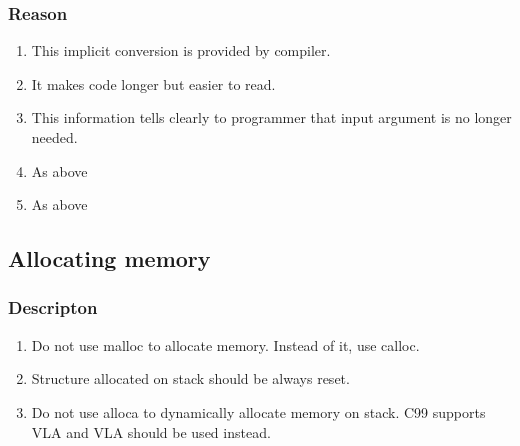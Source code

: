 \subsubsection{Reason}
\begin{enumerate}
    \item This implicit conversion is provided by compiler.
    \item It makes code longer but easier to read.
    \item This information tells clearly to programmer that input argument is no longer needed.
    \item As above
    \item As above
\end{enumerate}

\subsection{Allocating memory}
\subsubsection{Descripton}
\begin{enumerate}
    \item Do not use malloc to allocate memory. Instead of it, use calloc.
    \item Structure allocated on stack should be always reset.
    \item Do not use alloca to dynamically allocate memory on stack. C99 supports VLA and VLA should be used instead.
\end{enumerate}

